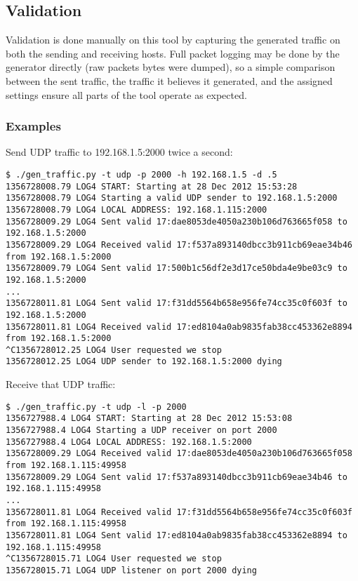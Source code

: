 \subsection{Validation}
\par Validation is done manually on this tool by capturing the generated traffic on both the sending and receiving hosts. Full packet logging may be done by the generator directly (raw packets bytes were dumped), so a simple comparison between the sent traffic, the traffic it believes it generated, and the assigned settings ensure all parts of the tool operate as expected.

\subsubsection{Examples}
\par Send \ac{UDP} traffic to 192.168.1.5:2000 twice a second:
\begin{lstlisting}
$ ./gen_traffic.py -t udp -p 2000 -h 192.168.1.5 -d .5
1356728008.79 LOG4 START: Starting at 28 Dec 2012 15:53:28
1356728008.79 LOG4 Starting a valid UDP sender to 192.168.1.5:2000
1356728008.79 LOG4 LOCAL ADDRESS: 192.168.1.115:2000
1356728009.29 LOG4 Sent valid 17:dae8053de4050a230b106d763665f058 to 192.168.1.5:2000
1356728009.29 LOG4 Received valid 17:f537a893140dbcc3b911cb69eae34b46 from 192.168.1.5:2000
1356728009.79 LOG4 Sent valid 17:500b1c56df2e3d17ce50bda4e9be03c9 to 192.168.1.5:2000
...
1356728011.81 LOG4 Sent valid 17:f31dd5564b658e956fe74cc35c0f603f to 192.168.1.5:2000
1356728011.81 LOG4 Received valid 17:ed8104a0ab9835fab38cc453362e8894 from 192.168.1.5:2000
^C1356728012.25 LOG4 User requested we stop
1356728012.25 LOG4 UDP sender to 192.168.1.5:2000 dying
\end{lstlisting}

\par Receive that \ac{UDP} traffic:
\begin{lstlisting}
$ ./gen_traffic.py -t udp -l -p 2000
1356727988.4 LOG4 START: Starting at 28 Dec 2012 15:53:08
1356727988.4 LOG4 Starting a UDP receiver on port 2000
1356727988.4 LOG4 LOCAL ADDRESS: 192.168.1.5:2000
1356728009.29 LOG4 Received valid 17:dae8053de4050a230b106d763665f058 from 192.168.1.115:49958
1356728009.29 LOG4 Sent valid 17:f537a893140dbcc3b911cb69eae34b46 to 192.168.1.115:49958
...
1356728011.81 LOG4 Received valid 17:f31dd5564b658e956fe74cc35c0f603f from 192.168.1.115:49958
1356728011.81 LOG4 Sent valid 17:ed8104a0ab9835fab38cc453362e8894 to 192.168.1.115:49958
^C1356728015.71 LOG4 User requested we stop
1356728015.71 LOG4 UDP listener on port 2000 dying
\end{lstlisting}

